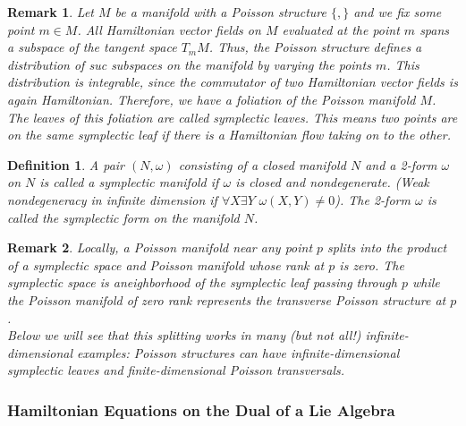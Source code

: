 \documentclass{article}
\newtheorem{defn}{Definition}
\newtheorem{rmk}{Remark}
\begin{document}
\begin{rmk}

	Let $M$ be a manifold with a Poisson structure $ \{ , \} $ and we fix some point $m \in M$. All Hamiltonian vector fields on $M$ evaluated at the point $m$ spans a subspace of the tangent space $T_m M$. Thus, the Poisson structure defines a distribution of suc subspaces on the manifold by varying the points $m$. This distribution is integrable, since the commutator of two Hamiltonian vector fields is again Hamiltonian. Therefore, we have a \textit{foliation} of the Poisson manifold $M$.\\
\indent The leaves of this foliation are called \textit{symplectic leaves}. This means two points are on the same symplectic leaf if there is a Hamiltonian flow taking on to the other.

\end{rmk}

\begin{defn}

	A pair $(N,\omega)$ consisting of a closed manifold $N$ and a 2-form $\omega$ on $N$ is called a \textit{symplectic manifold} if $\omega$ is closed and nondegenerate. (Weak nondegeneracy in infinite dimension if $\forall X \exists Y \hspace{4pt} \omega(X,Y) \neq 0$). The 2-form $\omega$ is called the \textit{symplectic form} on the manifold $N$.\\

\end{defn}


\begin{rmk}

Locally, a Poisson manifold near any point $p$ splits into the product of a symplectic space and Poisson manifold whose rank at $p$ is zero. The symplectic space is aneighborhood of the symplectic leaf passing through $p$ while the Poisson manifold of zero rank represents the transverse Poisson structure at $p$.\\
\indent Below we will see that this splitting works in many (but not all!) infinite-dimensional examples: Poisson structures can have infinite-dimensional symplectic leaves and finite-dimensional Poisson transversals.

\end{rmk}

\subsubsection{Hamiltonian Equations on the Dual of a Lie Algebra}
\end{document}

